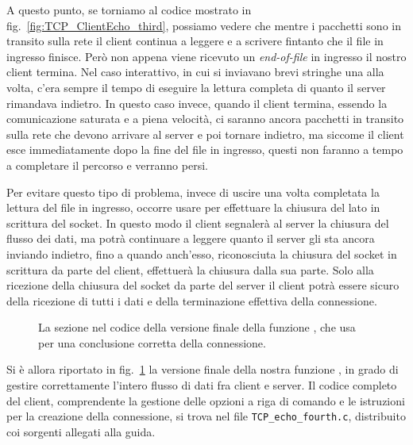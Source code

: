 A questo punto, se torniamo al codice mostrato in
fig.~\ref{fig:TCP_ClientEcho_third}, possiamo vedere che mentre i pacchetti
sono in transito sulla rete il client continua a leggere e a scrivere fintanto
che il file in ingresso finisce. Però non appena viene ricevuto un
\textit{end-of-file} in ingresso il nostro client termina. Nel caso
interattivo, in cui si inviavano brevi stringhe una alla volta, c'era sempre
il tempo di eseguire la lettura completa di quanto il server rimandava
indietro. In questo caso invece, quando il client termina, essendo la
comunicazione saturata e a piena velocità, ci saranno ancora pacchetti in
transito sulla rete che devono arrivare al server e poi tornare indietro, ma
siccome il client esce immediatamente dopo la fine del file in ingresso,
questi non faranno a tempo a completare il percorso e verranno persi.

Per evitare questo tipo di problema, invece di uscire una volta completata la
lettura del file in ingresso, occorre usare  per effettuare la
chiusura del lato in scrittura del socket. In questo modo il client segnalerà
al server la chiusura del flusso dei dati, ma potrà continuare a leggere
quanto il server gli sta ancora inviando indietro, fino a quando anch'esso,
riconosciuta la chiusura del socket in scrittura da parte del client,
effettuerà la chiusura dalla sua parte. Solo alla ricezione della chiusura del
socket da parte del server il client potrà essere sicuro della ricezione di
tutti i dati e della terminazione effettiva della connessione.

\begin{figure}[!htbp]
  \footnotesize \centering
  \begin{minipage}[c]{\codesamplewidth}
  \end{minipage} 
  \normalsize
  \caption{La sezione nel codice della versione finale della funzione
    , che usa  per una conclusione corretta
    della connessione.}
  \label{fig:TCP_ClientEcho}
\end{figure}

Si è allora riportato in fig.~\ref{fig:TCP_ClientEcho} la versione finale
della nostra funzione , in grado di gestire correttamente
l'intero flusso di dati fra client e server. Il codice completo del client,
comprendente la gestione delle opzioni a riga di comando e le istruzioni per
la creazione della connessione, si trova nel file
\texttt{TCP\_echo\_fourth.c}, distribuito coi sorgenti allegati alla guida.

